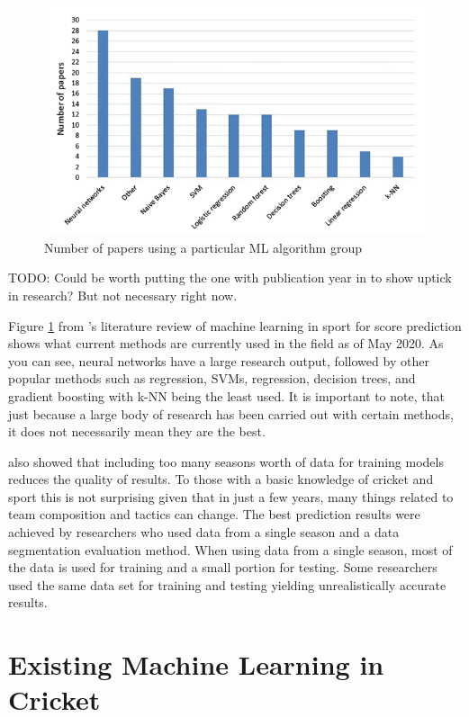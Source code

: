 \documentclass[12pt,a4paper]{report}
\theoremstyle{definition}
\begin{document}
\begin{figure}[H]
    \centering
    \includegraphics[width=\linewidth]{Horvat&Job_Figure2.png}
    \caption{Number of papers using a particular ML algorithm group \citep{horvat2020}}
    \label{fig:NoPapers}
\end{figure}

TODO: Could be worth putting the one with publication year in to show uptick in research? But not necessary right now.

Figure \ref{fig:NoPapers} from \citet{horvat2020}'s literature review of machine learning in sport for score prediction shows what current methods are currently used in the field as of May 2020. 
As you can see, neural networks have a large research output, followed by other popular methods such as regression, SVMs, regression, decision trees, and gradient boosting with k-NN being the least used. 
It is important to note, that just because a large body of research has been carried out with certain methods, it does not necessarily mean they are the best. 

\citet{horvat2020} also showed that including too many seasons worth of data for training models reduces the quality of results. 
To those with a basic knowledge of cricket and sport this is not surprising given that in just a few years, many things related to team composition and tactics can change. 
The best prediction results were achieved by researchers who used data from a single season and a data segmentation evaluation method. 
When using data from a single season, most of the data is used for training and a small portion for testing. 
Some researchers used the same data set for training and testing yielding unrealistically accurate results.

\section{Existing Machine Learning in Cricket}
\end{document}
